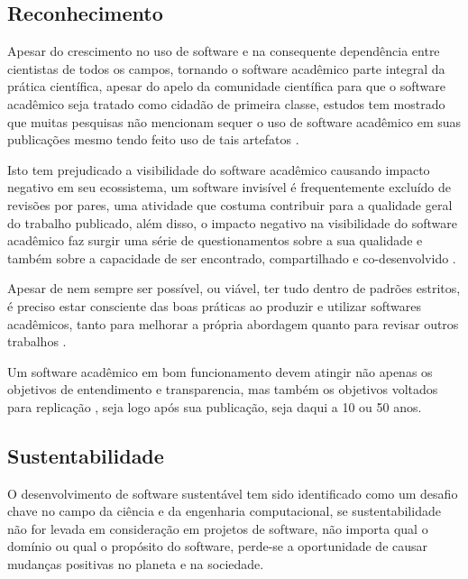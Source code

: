 \subsection{Reconhecimento}


Apesar do crescimento no uso de software e na consequente dependência entre
cientistas de todos os campos, tornando o software acadêmico parte integral da
prática científica, apesar do apelo da comunidade científica para que o
software acadêmico seja tratado como cidadão de primeira classe, estudos tem
mostrado que muitas pesquisas não mencionam sequer o uso de software acadêmico
em suas publicações mesmo tendo feito uso de tais artefatos
\cite{momcheva2015software} \cite{howison2016software}.

Isto tem prejudicado a visibilidade do software acadêmico causando impacto
negativo em seu ecossistema, um software invisível é frequentemente excluído de
revisões por pares, uma atividade que costuma contribuir para a qualidade geral
do trabalho publicado, além disso, o
impacto negativo na visibilidade do software acadêmico faz surgir uma
série de questionamentos sobre a sua qualidade e também sobre a
capacidade de ser encontrado, compartilhado e co-desenvolvido
\cite{howison2013, katz2014transitive} \cite{howison2016software}.

Apesar de nem sempre ser possível, ou viável, ter tudo dentro de padrões
estritos, é preciso estar consciente das boas práticas ao produzir e utilizar
softwares acadêmicos, tanto para melhorar a própria abordagem quanto para
revisar outros trabalhos \cite{wilson2014best}.

Um software acadêmico em bom funcionamento devem atingir não apenas os
objetivos de entendimento e transparencia, mas também os objetivos voltados
para replicação \cite{Stodden2010}, seja logo após sua publicação, seja daqui
a 10 ou 50 anos.

\subsection{Sustentabilidade}

O desenvolvimento de software sustentável tem sido identificado como um desafio
chave no campo da ciência e da engenharia computacional, se sustentabilidade
não for levada em consideração em projetos de software, não importa qual o
domínio ou qual o propósito do software, perde-se a oportunidade de causar
mudanças positivas no planeta e na sociedade.

